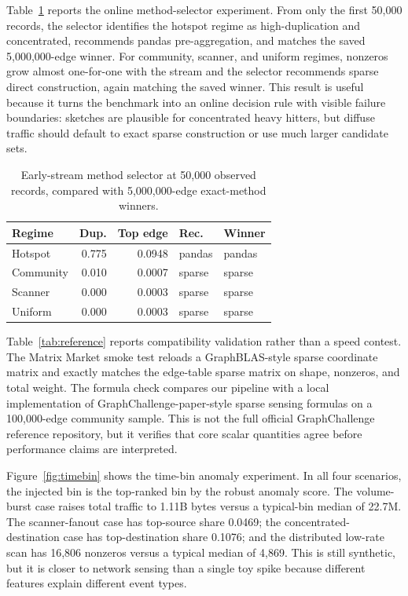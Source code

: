 \documentclass[conference]{IEEEtran}
\begin{document}
Table~\ref{tab:selector} reports the online method-selector experiment. From only the first 50,000 records, the selector identifies the hotspot regime as high-duplication and concentrated, recommends pandas pre-aggregation, and matches the saved 5,000,000-edge winner. For community, scanner, and uniform regimes, nonzeros grow almost one-for-one with the stream and the selector recommends sparse direct construction, again matching the saved winner. This result is useful because it turns the benchmark into an online decision rule with visible failure boundaries: sketches are plausible for concentrated heavy hitters, but diffuse traffic should default to exact sparse construction or use much larger candidate sets.

\begin{table}[t]
\centering
\caption{Early-stream method selector at 50,000 observed records, compared with 5,000,000-edge exact-method winners.}
\label{tab:selector}
\begin{tabular}{lrrll}
\toprule
Regime & Dup. & Top edge & Rec. & Winner \\
\midrule
Hotspot & 0.775 & 0.0948 & pandas & pandas \\
Community & 0.010 & 0.0007 & sparse & sparse \\
Scanner & 0.000 & 0.0003 & sparse & sparse \\
Uniform & 0.000 & 0.0003 & sparse & sparse \\
\bottomrule
\end{tabular}
\end{table}

Table~\ref{tab:reference} reports compatibility validation rather than a speed contest. The Matrix Market smoke test reloads a GraphBLAS-style sparse coordinate matrix and exactly matches the edge-table sparse matrix on shape, nonzeros, and total weight. The formula check compares our pipeline with a local implementation of GraphChallenge-paper-style sparse sensing formulas on a 100,000-edge community sample. This is not the full official GraphChallenge reference repository, but it verifies that core scalar quantities agree before performance claims are interpreted.

Figure~\ref{fig:timebin} shows the time-bin anomaly experiment. In all four scenarios, the injected bin is the top-ranked bin by the robust anomaly score. The volume-burst case raises total traffic to 1.11B bytes versus a typical-bin median of 22.7M. The scanner-fanout case has top-source share 0.0469; the concentrated-destination case has top-destination share 0.1076; and the distributed low-rate scan has 16,806 nonzeros versus a typical median of 4,869. This is still synthetic, but it is closer to network sensing than a single toy spike because different features explain different event types.
\end{document}

